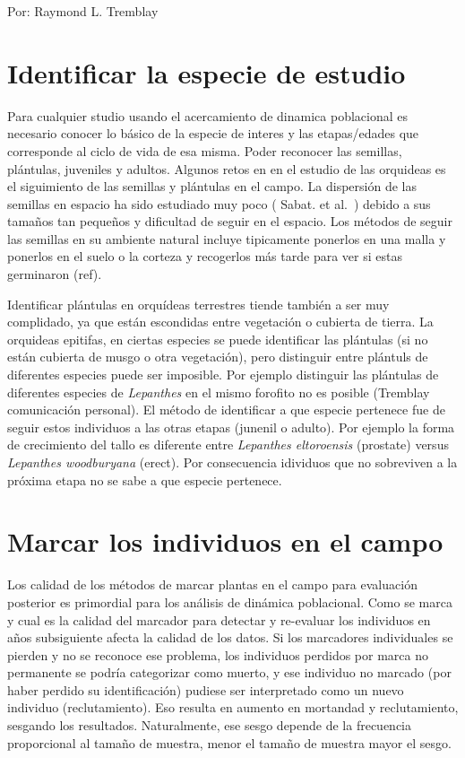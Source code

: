 \documentclass[
]{book}
\theoremstyle{definition}
\theoremstyle{definition}
\theoremstyle{definition}
\theoremstyle{definition}
\theoremstyle{remark}
\begin{document}
Por: Raymond L. Tremblay

\hypertarget{identificar-la-especie-de-estudio}{%
\section{Identificar la especie de estudio}\label{identificar-la-especie-de-estudio}}

Para cualquier studio usando el acercamiento de dinamica poblacional es necesario conocer lo básico de la especie de interes y las etapas/edades que corresponde al ciclo de vida de esa misma. Poder reconocer las semillas, plántulas, juveniles y adultos. Algunos retos en en el estudio de las orquideas es el siguimiento de las semillas y plántulas en el campo. La dispersión de las semillas en espacio ha sido estudiado muy poco ( Sabat. et al.~) debido a sus tamaños tan pequeños y dificultad de seguir en el espacio. Los métodos de seguir las semillas en su ambiente natural incluye tipicamente ponerlos en una malla y ponerlos en el suelo o la corteza y recogerlos más tarde para ver si estas germinaron (ref).

Identificar plántulas en orquídeas terrestres tiende también a ser muy complidado, ya que están escondidas entre vegetación o cubierta de tierra. La orquideas epitifas, en ciertas especies se puede identificar las plántulas (si no están cubierta de musgo o otra vegetación), pero distinguir entre plántuls de diferentes especies puede ser imposible. Por ejemplo distinguir las plántulas de diferentes especies de \emph{Lepanthes} en el mismo forofito no es posible (Tremblay comunicación personal). El método de identificar a que especie pertenece fue de seguir estos individuos a las otras etapas (junenil o adulto). Por ejemplo la forma de crecimiento del tallo es diferente entre \emph{Lepanthes eltoroensis} (prostate) versus \emph{Lepanthes woodburyana} (erect). Por consecuencia idividuos que no sobreviven a la próxima etapa no se sabe a que especie pertenece.

\hypertarget{marcar-los-individuos-en-el-campo}{%
\section{Marcar los individuos en el campo}\label{marcar-los-individuos-en-el-campo}}

Los calidad de los métodos de marcar plantas en el campo para evaluación posterior es primordial para los análisis de dinámica poblacional. Como se marca y cual es la calidad del marcador para detectar y re-evaluar los individuos en años subsiguiente afecta la calidad de los datos. Si los marcadores individuales se pierden y no se reconoce ese problema, los individuos perdidos por marca no permanente se podría categorizar como muerto, y ese individuo no marcado (por haber perdido su identificación) pudiese ser interpretado como un nuevo individuo (reclutamiento). Eso resulta en aumento en mortandad y reclutamiento, sesgando los resultados. Naturalmente, ese sesgo depende de la frecuencia proporcional al tamaño de muestra, menor el tamaño de muestra mayor el sesgo.
\end{document}
